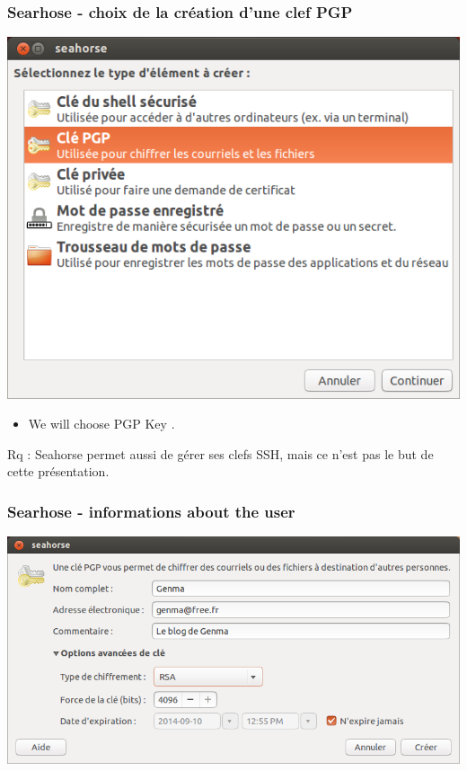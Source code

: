 \documentclass{beamer}
\begin{document}
\begin{frame}
\frametitle{Searhose - choix de la création d'une clef PGP}
\begin{center}
\includegraphics[scale=0.3] {./images/Seahorse02_creationclef.png}
\end{center}
\begin{itemize}
\item We will choose PGP Key	.
\end{itemize}
Rq : Seahorse permet aussi de gérer ses clefs SSH, mais ce n'est pas le but de cette présentation.
\end{frame}

\begin{frame}
\frametitle{Searhose - informations about the user}
\begin{center}
\includegraphics[scale=0.4] {./images/Seahorse03_creationclef.png}
\end{center}
\begin{itemize}
\end{itemize}	
\end{frame}
\end{document}
